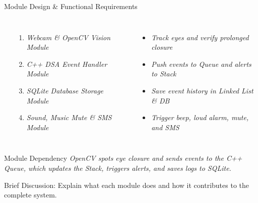 \documentclass[aspectratio=169,11pt]{beamer}
\newcommand{\smallnote}[1]{%
\vspace{0.08cm}
{\scriptsize\color{GEUGrey}#1}
}
\newcommand{\placeholder}[1]{%
\textit{\color{GEUGrey}#1}
}
\begin{document}
\begin{frame}{Module Design \& Functional Requirements}
\vspace{-2mm}
\begin{columns}[T, totalwidth=\textwidth]
\textbf{\color{GEUBlue}{Major Modules}}
\begin{enumerate}
\itemsep 0pt
\item \placeholder{Webcam \& OpenCV Vision Module}
\item \placeholder{C++ DSA Event Handler Module}
\item \placeholder{SQLite Database Storage Module}
\item \placeholder{Sound, Music Mute \& SMS Module}
\end{enumerate}

\textbf{\color{GEUBlue}{Functional Requirements}}
\begin{itemize}
\itemsep 0pt
\item \placeholder{Track eyes and verify prolonged closure}
\item \placeholder{Push events to Queue and alerts to Stack}
\item \placeholder{Save event history in Linked List \& DB}
\item \placeholder{Trigger beep, loud alarm, mute, and SMS}
\end{itemize}
\end{columns}

\vspace{1mm}
\begin{block}{Module Dependency}
\placeholder{OpenCV spots eye closure and sends events to the C++ Queue, which updates the Stack, triggers alerts, and saves logs to SQLite.}
\end{block}

\vspace{-1mm}
\smallnote{Brief Discussion: Explain what each module does and how it contributes to the complete system.}
\end{frame}
\end{document}
